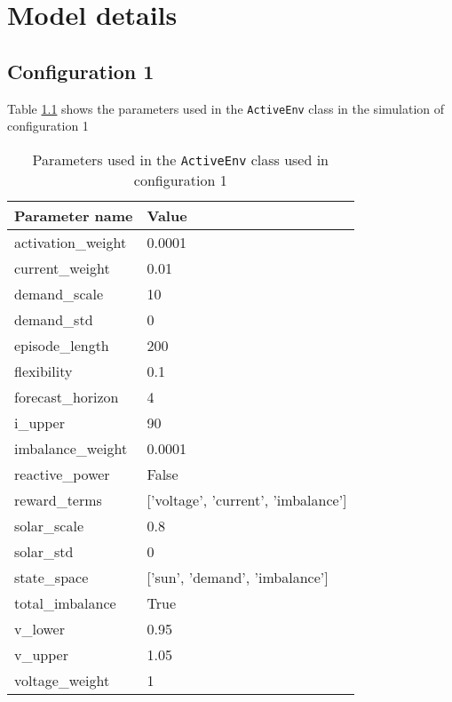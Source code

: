 \documentclass[class=book, crop=false]{standalone}
\begin{document}
\chapter{Model details}
\section{Configuration 1}\label{section:apendix_config1}
Table \ref{apendix:config1:params} shows the parameters used in the \texttt{ActiveEnv} class in the simulation of configuration 1

\begin{table}[ht]
\center
\begin{tabular}{ll}
Parameter name     & Value                                     \\
\hline
activation\_weight & 0.0001                                    \\
current\_weight    & 0.01                                      \\
demand\_scale      & 10                                        \\
demand\_std        & 0                                         \\
episode\_length    & 200                                       \\
flexibility        & 0.1                                       \\
forecast\_horizon  & 4                                         \\
i\_upper           & 90                                        \\
imbalance\_weight  & 0.0001                                    \\
reactive\_power    & False                                     \\
reward\_terms      & {[}'voltage',  'current',  'imbalance'{]} \\
solar\_scale       & 0.8                                       \\
solar\_std         & 0                                         \\
state\_space       & {[}'sun', 'demand',  'imbalance'{]}       \\
total\_imbalance   & True                                      \\
v\_lower           & 0.95                                      \\
v\_upper           & 1.05                                      \\
voltage\_weight    & 1                                         \\
\hline
\end{tabular}
\caption{Parameters used in the \texttt{ActiveEnv} class used in configuration 1}
\label{apendix:config1:params}
\end{table}
\end{document}
